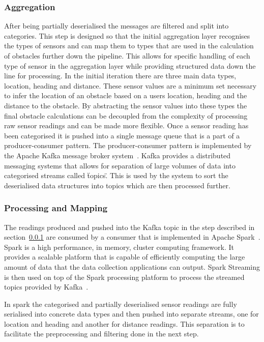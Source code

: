 \documentclass[prodmode,acmtosem]{acmsmall} %
\begin{document}
\subsubsection{Aggregation}
\label{sec:aggregation}
After being partially deserialised the messages are filtered and split into categories. This step is designed so that the initial aggregation layer recognises the types of sensors and can map them to types that are used in the calculation of obstacles further down the pipeline. This allows for specific handling of each type of sensor in the aggregation layer while providing structured data down the line for processing. In the initial iteration there are three main data types, location, heading and distance. These sensor values are a minimum set necessary to infer the location of an obstacle based on a users location, heading and the distance to the obstacle. By abstracting the sensor values into these types the final obstacle calculations can be decoupled from the complexity of processing raw sensor readings and can be made more flexible. Once a sensor reading has been categorised it is pushed into a single message queue that is a part of a producer-consumer pattern. The producer-consumer pattern is implemented by the Apache Kafka message broker system~\cite{ApacheKafka}. Kafka provides a distributed messaging systems that allows for separation of large volumes of data into categorised streams called \"topics\". This is used by the system to sort the deserialised data structures into topics which are then processed further.

\subsubsection{Processing and Mapping}
The readings produced and pushed into the Kafka topic in the step described in section~\ref{sec:aggregation} are consumed by a consumer that is implemented in Apache Spark~\cite{ApacheSpark}. Spark is a high performance, in memory, cluster computing framework. It provides a scalable platform that is capable of efficiently computing the large amount of data that the data collection applications can output. Spark Streaming is then used on top of the Spark processing platform to process the streamed topics provided by Kafka~\cite{ApacheSparkStreaming}.

In spark the categorised and partially deserialised sensor readings are fully serialised into concrete data types and then pushed into separate streams, one for location and heading and another for distance readings. This separation is to facilitate the preprocessing and filtering done in the next step. 
\end{document}
